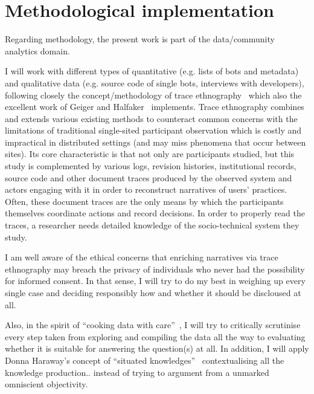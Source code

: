 \documentclass[pdftex,a4paper,11pt]{scrartcl}
\begin{document}
\section{Methodological implementation}
Regarding methodology, the present work is part of the data/community analytics domain. %

I will work with different types of quantitative (e.g. lists of bots and metadata) and qualitative data (e.g. source code of single bots, interviews with developers), following closely the concept/methodology of trace ethnography~\cite{GeiRib2011} which also the excellent work of Geiger and Halfaker~\cite{GeiHal2017} implements.
Trace ethnography combines and extends various existing methods to counteract common concerns with the limitations of traditional single-sited participant observation which is costly and impractical in distributed settings (and may miss phenomena that occur between sites).
Its core characteristic is that not only are participants studied, but this study is complemented by various logs, revision histories, institutional records, source code and other document traces produced by the observed system and actors engaging with it in order to reconstruct narratives of users' practices.
Often, these document traces are the only means by which the participants themselves coordinate actions and record decisions.
In order to properly read the traces, a researcher needs detailed knowledge of the socio-technical system they study.

I am well aware of the ethical concerns that enriching narratives via trace ethnography may breach the privacy of individuals who never had the possibility for informed consent.
In that sense, I will try to do my best in weighing up every single case and deciding responsibly how and whether it should be discloused at all.

Also, in the spirit of ``cooking data with care''~\cite{GeiHal2017}, I will try to critically scrutinise every step taken from exploring and compiling the data all the way to evaluating whether it is suitable for answering the question(s) at all.
In addition, I will apply Donna Haraway's concept of ``situated knowledges''~\cite{Haraway1988} contextualising all the knowledge production.. instead of trying to argument from a unmarked omniscient objectivity.
\end{document}
